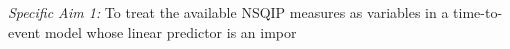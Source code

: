 \emph{Specific Aim 1:} To treat the available NSQIP measures as variables in a time-to-event model whose linear predictor is an impor